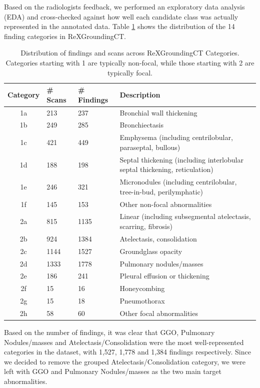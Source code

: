 Based on the radiologists feedback, we performed an exploratory data analysis (EDA) and cross-checked against how well each
candidate class was actually represented in the annotated data. Table \ref{tab:rex_category_distribution} shows the distribution
of the 14 finding categories in ReXGroundingCT.

\begin{table}[htbp]
\centering
\caption[Distribution of Findings and Scans Across ReXGroundingCT Categories]
{Distribution of findings and scans across ReXGroundingCT Categories. Categories starting with 1 are typically non-focal,
while those starting with 2 are typically focal.}
\label{tab:rex_category_distribution}
\begin{tabularx}{\textwidth}{clXX}
\hline
\textbf{Category} & \textbf{\# Scans} & \textbf{\# Findings} & \textbf{Description} \\
\hline
1a & 213 & 237 & Bronchial wall thickening \\
1b & 249 & 285 & Bronchiectasis \\
1c & 421 & 449 & Emphysema (including centrilobular, paraseptal, bullous) \\
1d & 188 & 198 & Septal thickening (including interlobular septal thickening, reticulation) \\
1e & 246 & 321 & Micronodules (including centrilobular, tree-in-bud, perilymphatic) \\
1f & 145 & 153 & Other non-focal abnormalities \\
2a & 815 & 1135 & Linear (including subsegmental atelectasis, scarring, fibrosis) \\
2b & 924 & 1384 & Atelectasis, consolidation \\
2c & 1144 & 1527 & Groundglass opacity \\
2d & 1333 & 1778 & Pulmonary nodules/masses \\
2e & 186 & 241 & Pleural effusion or thickening \\
2f & 15 & 16 & Honeycombing \\
2g & 15 & 18 & Pneumothorax \\
2h & 58 & 60 & Other focal abnormalities \\
\hline
\end{tabularx}
\end{table}

Based on the number of findings, it was clear that GGO, Pulmonary Nodules/masses and Atelectasis/Consolidation were the most
well-represented categories in the dataset, with 1,527, 1,778 and 1,384 findings respectively. Since we decided to remove
the grouped Atelectasis/Consolidation category, we were left with GGO and Pulmonary Nodules/masses as the two main target abnormalities.

